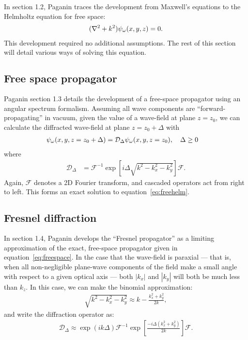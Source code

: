 \documentclass{article}
\begin{document}
In section 1.2, Paganin traces the development from Maxwell's equations to the
Helmholtz equation for free space:
\begin{align}
  (\nabla^2 + k^2)\psi_{\omega}(x,y,z) = 0.
  \label{eq:freehelm}
\end{align}
This development required no additional assumptions. The rest of this
section will detail various ways of solving this equation.

\subsection{Free space propagator}\label{freespace}
Paganin section 1.3 details the development of a free-space propagator using an
angular spectrum formalism. Assuming all wave components are
``forward-propagating'' in vacuum, given the value of a wave-field at plane
$z=z_0$, we can calculate the diffracted wave-field at plane $z=z_0 + \Delta$ with
\begin{align}
  \label{eq:propagated}
  \psi_{\omega}(x,y,z=z_0 + \Delta) &= \mathcal{D}_{\Delta}\psi_{\omega}(x,y,z=z_0), \quad \Delta \ge 0
\end{align}
where
\begin{align}
  \mathcal{D}_{\Delta} &= \mathcal{F}^{-1}\exp\left[i\Delta\sqrt{k^2 - k_x^2 - k_y^2}\right]\mathcal{F}.\label{eq:freespace}
\end{align}
Again, $\mathcal{F}$ denotes a 2D Fourier transform, and cascaded operators act
from right to left. This forms an exact solution to equation~\ref{eq:freehelm}.

\subsection{Fresnel diffraction}
In section 1.4, Paganin develops the ``Fresnel propagator'' as a limiting
approximation of the exact, free-space propagator given in
equation~\ref{eq:freespace}. In the case that the wave-field is
paraxial --- that is, when all non-negligible plane-wave components of
the field make a small angle with respect to a given optical axis --- both
$|k_x|$ and $|k_y|$ will both be much less than $k_z$. In this case,
we can make the binomial approximation:
\begin{align}
  \sqrt{k^2 - k_x^2 - k_y^2} \approx k - \frac{k_x^2 + k_y^2}{2k},
\end{align}
and write the diffraction operator as:
\begin{align}
  \mathcal{D}_{\Delta} \approx \exp\left(ik\Delta\right)\mathcal{F}^{-1}\exp\left[\frac{-i\Delta\left(k_x^2 + k_y^2\right)}{2k}\right]\mathcal{F}.
  \label{eq:fresnel}
\end{align}
\end{document}

